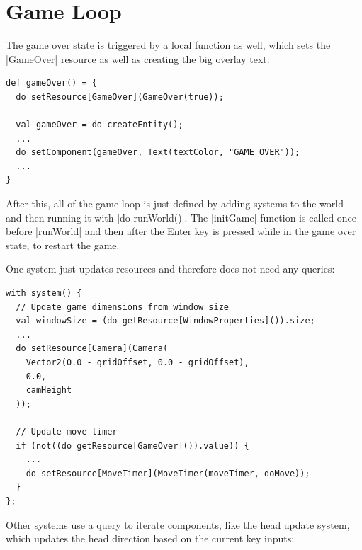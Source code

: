 \section{Game Loop}

The game over state is triggered by a local function as well, which sets the |GameOver| resource as well as creating the big overlay text:

\begin{lstlisting}
def gameOver() = {
  do setResource[GameOver](GameOver(true));

  val gameOver = do createEntity();
  ...
  do setComponent(gameOver, Text(textColor, "GAME OVER"));
  ...
}
\end{lstlisting}

After this, all of the game loop is just defined by adding systems to the world and then running it with |do runWorld()|. The |initGame| function is called once before |runWorld| and then after the Enter key is pressed while in the game over state, to restart the game.

One system just updates resources and therefore does not need any queries:

\begin{lstlisting}
with system() {
  // Update game dimensions from window size
  val windowSize = (do getResource[WindowProperties]()).size;
  ...
  do setResource[Camera](Camera(
    Vector2(0.0 - gridOffset, 0.0 - gridOffset),
    0.0,
    camHeight
  ));

  // Update move timer
  if (not((do getResource[GameOver]()).value)) {
	...
    do setResource[MoveTimer](MoveTimer(moveTimer, doMove));
  }
};
\end{lstlisting}

Other systems use a query to iterate components, like the head update system, which updates the head direction based on the current key inputs:

